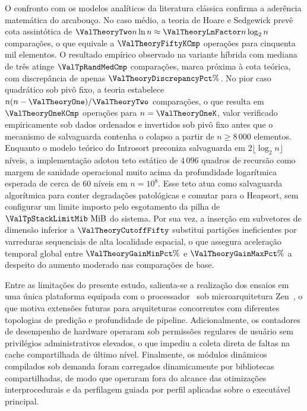 \documentclass[12pt]{article}
\begin{document}
O confronto com os modelos analíticos da literatura clássica confirma a aderência matemática do arcabouço. No caso médio, a teoria de Hoare e Sedgewick prevê cota assintótica de $\ValTheoryTwo n \ln n \approx \ValTheoryLnFactor n \log_2 n$ comparações, o que equivale a $\ValTheoryFiftyKCmp$ operações para cinquenta mil elementos. O resultado empírico observado na variante híbrida com mediana de três atinge $\ValTpRandMedCmp$ comparações, marca próxima à cota teórica, com discrepância de apenas $\ValTheoryDiscrepancyPct\%$. No pior caso quadrático sob pivô fixo, a teoria estabelece $n(n-\ValTheoryOne)/\ValTheoryTwo$ comparações, o que resulta em $\ValTheoryOneKCmp$ operações para $n = \ValTheoryOneK$, valor verificado empiricamente sob dados ordenados e invertidos sob pivô fixo antes que o mecanismo de salvaguarda contenha o colapso a partir de $n \ge 8\,000$ elementos. Enquanto o modelo teórico do Introsort preconiza salvaguarda em $2 \lfloor \log_2 n \rfloor$ níveis, a implementação adotou teto estático de $4\,096$ quadros de recursão como margem de sanidade operacional muito acima da profundidade logarítmica esperada de cerca de 60 níveis em $n = 10^8$. Esse teto atua como salvaguarda algorítmica para conter degradações patológicas e comutar para o Heapsort, sem configurar um limite imposto pelo esgotamento da pilha de $\ValTpStackLimitMib\text{ MiB}$ do sistema. Por sua vez, a inserção em subvetores de dimensão inferior a $\ValTheoryCutoffFifty$ substitui partições ineficientes por varreduras sequenciais de alta localidade espacial, o que assegura aceleração temporal global entre $\ValTheoryGainMinPct\%$ e $\ValTheoryGainMaxPct\%$ a despeito do aumento moderado nas comparações de base.

Entre as limitações do presente estudo, salienta-se a realização dos ensaios em uma única plataforma equipada com o processador \ValHostCpuModel\ sob microarquitetura Zen~\ValZenArchGeneration, o que motiva extensões futuras para arquiteturas concorrentes com diferentes topologias de predição e profundidade de pipeline. Adicionalmente, os contadores de desempenho de hardware operaram sob permissões regulares de usuário sem privilégios administrativos elevados, o que impediu a coleta direta de faltas na cache compartilhada de último nível. Finalmente, os módulos dinâmicos compilados sob demanda foram carregados dinamicamente por bibliotecas compartilhadas, de modo que operaram fora do alcance das otimizações interprocedurais e da perfilagem guiada por perfil aplicadas sobre o executável principal.
\end{document}

